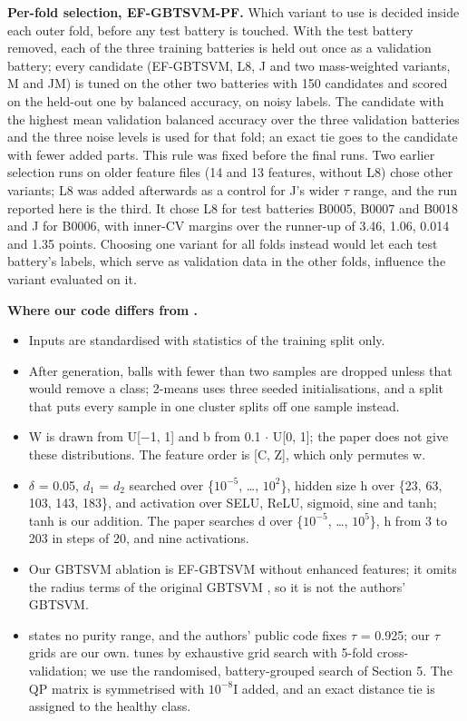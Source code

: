 \documentclass[conference,a4paper]{IEEEtran}
\begin{document}
\textbf{Per-fold selection, EF-GBTSVM-PF.} Which variant to use is decided inside each outer fold, before any test battery is touched. With the test battery removed, each of the three training batteries is held out once as a validation battery; every candidate (EF-GBTSVM, L8, J and two mass-weighted variants, M and JM) is tuned on the other two batteries with 150 candidates and scored on the held-out one by balanced accuracy, on noisy labels. The candidate with the highest mean validation balanced accuracy over the three validation batteries and the three noise levels is used for that fold; an exact tie goes to the candidate with fewer added parts. This rule was fixed before the final runs. Two earlier selection runs on older feature files (14 and 13 features, without L8) chose other variants; L8 was added afterwards as a control for J's wider $\tau$ range, and the run reported here is the third. It chose L8 for test batteries B0005, B0007 and B0018 and J for B0006, with inner-CV margins over the runner-up of 3.46, 1.06, 0.014 and 1.35 points. Choosing one variant for all folds instead would let each test battery's labels, which serve as validation data in the other folds, influence the variant evaluated on it.

\textbf{Where our code differs from \cite{r29}.}

\begin{itemize}
\item Inputs are standardised with statistics of the training split only.
\item After generation, balls with fewer than two samples are dropped unless that would remove a class; 2-means uses three seeded initialisations, and a split that puts every sample in one cluster splits off one sample instead.
\item W is drawn from U[$-$1, 1] and b from 0.1 $\cdot$ U[0, 1]; the paper does not give these distributions. The feature order is [C, Z], which only permutes w.
\item $\delta$ = 0.05, $d_{1}$ = $d_{2}$ searched over \{$10^{-5}$, \ldots{}, $10^{2}$\}, hidden size h over \{23, 63, 103, 143, 183\}, and activation over SELU, ReLU, sigmoid, sine and tanh; tanh is our addition. The paper searches d over \{$10^{-5}$, \ldots{}, $10^{5}$\}, h from 3 to 203 in steps of 20, and nine activations.
\item Our GBTSVM ablation is EF-GBTSVM without enhanced features; it omits the radius terms of the original GBTSVM \cite{r30}, so it is not the authors' GBTSVM.
\item \cite{r29} states no purity range, and the authors' public code fixes $\tau$ = 0.925; our $\tau$ grids are our own. \cite{r29} tunes by exhaustive grid search with 5-fold cross-validation; we use the randomised, battery-grouped search of Section 5. The QP matrix is symmetrised with $10^{-8}$I added, and an exact distance tie is assigned to the healthy class.
\end{itemize}
\end{document}
